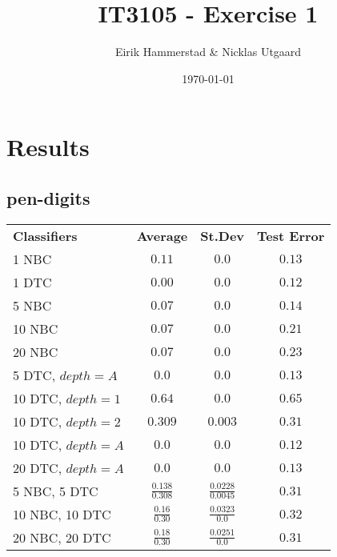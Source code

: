 \documentclass[12pt]{article}
\title{IT3105 - Exercise 1}
\author{
        Eirik Hammerstad \& Nicklas Utgaard
}
\date{\today}
\begin{document}
\maketitle
\pagebreak
\tableofcontents
\pagebreak
\section{Results}
	\subsection{pen-digits}\label{sec:pen-digits}
		\begin{tabular}{lccc}
			\textbf{Classifiers} & \textbf{Average} & \textbf{St.Dev} & \textbf{Test Error}\\
			1 NBC & $0.11$ & $0.0$ & $0.13$\\
			1 DTC & $0.00$ & $0.0$ & $0.12$\\
			5 NBC & $0.07$ & $0.0$ & $0.14$\\
			10 NBC & $0.07$ & $0.0$ & $0.21$\\
			20 NBC & $0.07$ & $0.0$ & $0.23$\\
			5 DTC, $depth = A$ & $0.0$ & $0.0$ & $0.13$ \\
			10 DTC, $depth = 1$ & $0.64$ & $0.0$ & $0.65$ \\
			10 DTC, $depth = 2$ & $0.309$ & $0.003$ & $0.31$ \\
			10 DTC, $depth = A$ & $0.0$ & $0.0$ & $0.12$ \\
			20 DTC, $depth = A$ & $0.0$ & $0.0$ & $0.13$ \\
			5 NBC, 5 DTC & $\frac{0.138}{0.308}$ & $\frac{0.0228}{0.0045}$ & $0.31$ \\
			10 NBC, 10 DTC & $\frac{0.16}{0.30}$ & $\frac{0.0323}{0.0}$ & $0.32$ \\
			20 NBC, 20 DTC & $\frac{0.18}{0.30}$ & $\frac{0.0251}{0.0}$ & $0.31$ \\
		\end{tabular}
		
\end{document}
